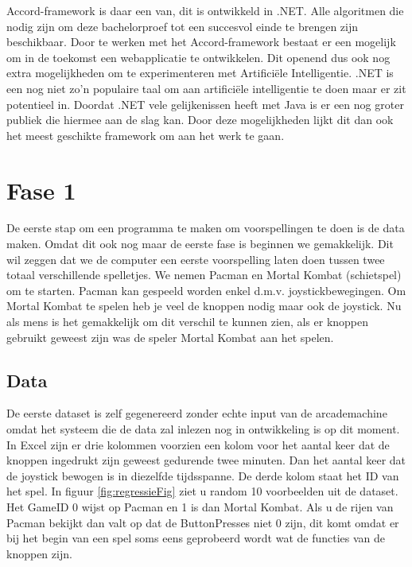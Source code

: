 Accord-framework is daar een van, dit is ontwikkeld in .NET. Alle algoritmen die nodig zijn om deze bachelorproef tot een succesvol einde te brengen zijn beschikbaar. \newline
Door te werken met het Accord-framework bestaat er een mogelijk om in de toekomst een webapplicatie te ontwikkelen. Dit openend dus ook nog extra mogelijkheden om te experimenteren met Artificiële Intelligentie. 
\newline
.NET is een nog niet zo'n populaire taal om aan artificiële intelligentie te doen maar er zit potentieel in. Doordat .NET vele gelijkenissen heeft met Java is er een nog groter publiek die hiermee aan de slag kan.
\newline
Door deze mogelijkheden lijkt dit dan ook het meest geschikte framework om aan het werk te gaan. 

\section{Fase 1}
\label{sec:Fase1}
De eerste stap om een programma te maken om voorspellingen te doen is de data maken. Omdat dit ook nog maar de eerste fase is beginnen we gemakkelijk. Dit wil zeggen dat we de computer een eerste voorspelling laten doen tussen twee totaal verschillende spelletjes. We nemen Pacman en Mortal Kombat (schietspel) om te starten. Pacman kan gespeeld worden enkel d.m.v. joystickbewegingen. Om Mortal Kombat te spelen heb je veel de knoppen nodig maar ook de joystick.  Nu als mens is het gemakkelijk om dit verschil te kunnen zien, als er knoppen gebruikt geweest zijn was de speler Mortal Kombat aan het spelen. 

\subsection{Data}
\label{sec:DataFase1}
De eerste dataset is zelf gegenereerd zonder echte input van de arcademachine omdat het systeem die de data zal inlezen nog in ontwikkeling is op dit moment. 
In Excel zijn er drie kolommen voorzien een kolom voor het aantal keer dat de knoppen ingedrukt zijn geweest gedurende twee minuten. Dan het aantal keer dat de joystick bewogen is in diezelfde tijdsspanne. De derde kolom staat het ID van het spel. 
In figuur \ref{fig:regressieFig} ziet u random 10 voorbeelden uit de dataset.
Het GameID 0 wijst op Pacman en 1 is dan Mortal Kombat. Als u de rijen van Pacman bekijkt dan valt op dat de ButtonPresses niet 0 zijn, dit komt omdat er bij het begin van een spel soms eens geprobeerd wordt wat de functies van de knoppen zijn. 

